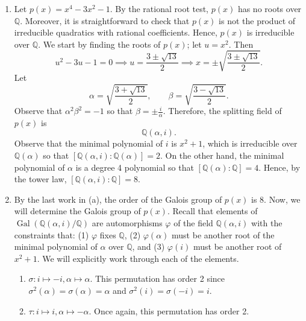 \documentclass{article}
\begin{document}
\begin{solutions}
	\vspace{-0.35cm}
	\begin{enumerate}[itemsep =-2pt,label = (\alph{*})]
			\item Let $p(x) = x^{4} - 3x^{2} - 1$. By the rational root test, $p(x)$ has no roots over $\mathbb{Q}$. Moreover, it is straightforward to check that $p(x)$ is not the product of irreducible quadratics with rational coefficients. Hence, $p(x)$ is irreducible over $\mathbb{Q}$. We start by finding the roots of $p(x)$; let $u = x^{2}$. Then 
			\begin{equation}
				u^{2} - 3u - 1 = 0 \implies u = \frac{3 \pm \sqrt{13}}{2} \implies x = \pm \sqrt{\frac{3 \pm \sqrt{13}}{2}}. 
			\end{equation}
			Let 
			\begin{equation}
				\alpha = \sqrt{\frac{3 + \sqrt{13}}{2}}, \qquad \beta = \sqrt{\frac{3 - \sqrt{13}}{2}}. 
			\end{equation}
			Observe that $\alpha^{2}\beta^{2} = -1$ so that $\beta = \pm \frac{i}{\alpha}$. Therefore, the splitting field of $p(x)$ is 
			\begin{equation}
				\mathbb{Q}(\alpha, i). 
			\end{equation}
			Observe that the minimal polynomial of $i$ is $x^{2} + 1$, which is irreducible over $\mathbb{Q}(\alpha)$ so that $[\mathbb{Q}(\alpha, i):\mathbb{Q}(\alpha)] = 2$. On the other hand, the minimal polynomial of $\alpha$ is a degree 4 polynomial so that $[\mathbb{Q}(\alpha): \mathbb{Q}] = 4$. Hence, by the tower law, $[\mathbb{Q}(\alpha, i): \mathbb{Q}] = 8$. 
			\item By the last work in (a), the order of the Galois group of $p(x)$ is $8$. Now, we will determine the Galois group of $p(x)$. Recall that elements of $\operatorname{Gal}(\mathbb{Q}(\alpha, i)/\mathbb{Q})$ are automorphisms $\varphi$ of the field $\mathbb{Q}(\alpha, i)$ with the constraints that: (1) $\varphi$ fixes $\mathbb{Q}$, (2) $\varphi(\alpha)$ must be another root of the minimal polynomial of $\alpha$ over $\mathbb{Q}$, and (3) $\varphi(i)$ must be another root of $x^{2} + 1$. We will explicitly work through each of the elements. 
			\begin{enumerate}[itemsep =-2pt,label =(\roman{*})]
				\item $\sigma: i \mapsto -i, \alpha \mapsto \alpha$. This permutation has order 2 since $\sigma^{2}(\alpha)  = \sigma(\alpha) = \alpha$ and $\sigma^{2}(i) = \sigma(-i) = i$. 
				\item $\tau: i \mapsto i, \alpha \mapsto -\alpha$. Once again, this permutation has order 2. 

\end{enumerate}
\end{enumerate}
\end{solutions}
\end{document}
